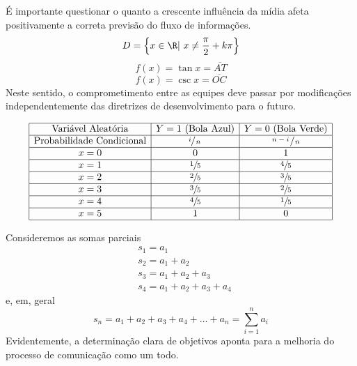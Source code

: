 \documentclass[fleqn]{icat-ufal}
\begin{document}
É importante questionar o quanto a crescente influência da mídia afeta
positivamente a correta previsão do fluxo de informações. 
\[
    D=\left\{x \in \R |\ x\neq \frac{\pi}{2} + k\pi\right\} 
\]
\[
    f(x) = \tan x = \overline{AT}
\]
\[
    f(x) = \csc x = \overline{OC}
\]
Neste sentido, o
comprometimento entre as equipes deve passar por modificações independentemente
das diretrizes de desenvolvimento para o futuro. 
\begin{ceqn} %
\[
\begin{array}{|c|c|c|}
        \hline
           \text{Variável Aleatória}     & Y=1 \text{ (Bola Azul)} & Y=0 \text{ (Bola Verde)} \\ \hline
        \text{Probabilidade Condicional} &    \sfrac{i}{\,n\,}     &  \sfrac{\,n-i\,}{\,n\,}  \\ \hline
                      x=0                &            0            &            1             \\ \hline
                      x=1                &      \sfrac{1}{5}       &       \sfrac{4}{5}       \\ \hline
                      x=2                &      \sfrac{2}{5}       &       \sfrac{3}{5}       \\ \hline
                      x=3                &      \sfrac{3}{5}       &       \sfrac{2}{5}       \\ \hline
                      x=4                &      \sfrac{4}{5}       &       \sfrac{1}{5}       \\ \hline
                      x=5                &            1            &            0             \\ \hline
\end{array}
\]
\end{ceqn}

Consideremos as somas parciais
\begin{align*}
         & s_1 = a_1                   \\
         & s_2 = a_1 + a_2             \\
         & s_3 = a_1 + a_2 + a_3       \\
         & s_4 = a_1 + a_2 + a_3 + a_4
\end{align*}
e, em, geral
\[
    s_n = a_1 + a_2 + a_3 + a_4 + \dots + a_n 
        = \sum_{i=1}^{n} a_i 
\]
Evidentemente, a determinação
clara de objetivos aponta para a melhoria do processo de comunicação como um
todo. 
\end{document}
